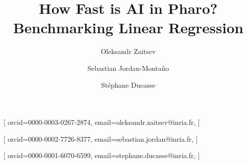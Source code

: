 \documentclass[]{ceurart}
\begin{document}


\title{How Fast is AI in Pharo?\\Benchmarking Linear Regression}

\author[1,2]{Oleksandr Zaitsev}[%
orcid=0000-0003-0267-2874,
email=oleksandr.zaitsev@inria.fr,
]
\cormark[1]
\fnmark[1]

\author[2]{Sebastian Jordan-Montaño}[%
orcid=0000-0002-7726-8377,
email=sebastian.jordan@inria.fr,
]
\cormark[1]
\fnmark[1]

\author[2]{Stéphane Ducasse}[%
orcid=0000-0001-6070-6599,
email=stephane.ducasse@inria.fr,
]

\address[1]{Arolla,
25 Rue du Louvre, 75001 Paris, France}
\address[2]{Univ. Lille, Inria, CNRS, Centrale Lille, UMR 9189 CRIStAL,
Park Plaza, Parc scientifique de la Haute-Borne, 40 Av. Halley Bât A, 59650 Villeneuve-d'Ascq, France}







\end{document}
